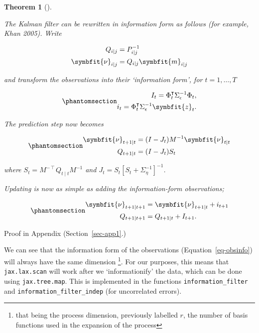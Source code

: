 \documentclass[
]{report}
\newcommand{\bv}[1]{\symbfit{#1}}
\theoremstyle{plain}
\theoremstyle{plain}
\newtheorem{theorem}{Theorem}[section]
\theoremstyle{plain}
\theoremstyle{remark}
\begin{document}
\begin{theorem}[]\protect\hypertarget{thm-information_filter}{}\label{thm-information_filter}

The Kalman filter can be rewritten in information form as follows (for
example, Khan 2005). Write

\[\begin{split}
Q_{i\mid j} &= P_{i\mid j}^{-1}\\
\bv\nu_{i\mid j} &= Q_{i\mid j} \bv m_{i\mid j}
\end{split}
\]

and transform the observations into their `information form', for
\(t=1,\dots, T\)

\begin{equation}\phantomsection\label{eq-obsinfo}{\begin{split}
I_{t} = \Phi_{t}^{\intercal} \Sigma_{\epsilon}^{-1}\Phi_{t},\\
i_{t} = \Phi_{t}^{\intercal} \Sigma_{\epsilon}^{-1} \bv z_{t}.
\end{split}
}\end{equation}

The prediction step now becomes

\begin{equation}\phantomsection\label{eq-infpred}{\begin{split}
\bv\nu_{t+1\mid t} &= (I-J_t) M^{-1}\bv\nu_{t\mid t}\\
Q_{t+1\mid t} &= (I-J_t) S_{t} 
\end{split}
}\end{equation}

where \(S_t = M^{-\intercal} Q_{t\mid t} M^{-1}\) and
\(J_t = S_t [S_{t}+\Sigma_{\eta}^{-1}]^{-1}\).

Updating is now as simple as adding the information-form observations;

\begin{equation}\phantomsection\label{eq-infupd}{\begin{split}
  \bv\nu_{t+1\mid t+1} &= \bv\nu_{t+1\mid t} + i_{t+1}\\
  Q_{t+1\mid t+1} &= Q_{t+1\mid t} + I_{t+1}.
\end{split}
}\end{equation}

\end{theorem}

Proof in Appendix (Section~\ref{sec-app1}.)

We can see that the information form of the observations
(Equation~\ref{eq-obsinfo}) will always have the same dimension
\footnote{that being the process dimension, previously labelled \(r\),
  the number of basis functions used in the expansion of the process}.
For our purposes, this means that \texttt{jax.lax.scan} will work after
we `informationify' the data, which can be done using
\texttt{jax.tree.map}. This is implemented in the functions
\texttt{information\_filter} and \texttt{information\_filter\_indep}
(for uncorrelated errors).
\end{document}
